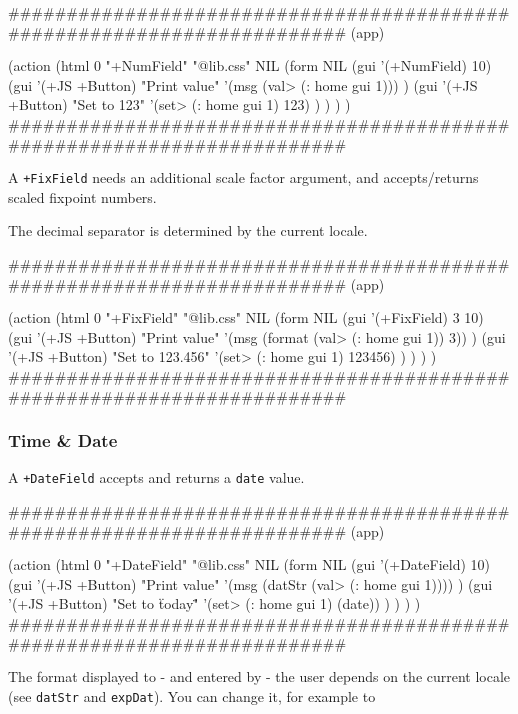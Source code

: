 \begin{wideverbatim}
########################################################################
(app)

(action
   (html 0 "+NumField" "@lib.css" NIL
      (form NIL
         (gui '(+NumField) 10)
         (gui '(+JS +Button) "Print value"
            '(msg (val> (: home gui 1))) )
         (gui '(+JS +Button) "Set to 123"
            '(set> (: home gui 1) 123) ) ) ) )
########################################################################
\end{wideverbatim}

A \texttt{+FixField} needs an additional scale factor argument, and
accepts/returns scaled fixpoint numbers.

The decimal separator is determined by the current locale.


\begin{wideverbatim}
########################################################################
(app)

(action
   (html 0 "+FixField" "@lib.css" NIL
      (form NIL
         (gui '(+FixField) 3 10)
         (gui '(+JS +Button) "Print value"
            '(msg (format (val> (: home gui 1)) 3)) )
         (gui '(+JS +Button) "Set to 123.456"
            '(set> (: home gui 1) 123456) ) ) ) )
########################################################################
\end{wideverbatim}

\subsubsection{ Time \& Date}
\label{sec:appl-devel-time-date}%

A \texttt{+DateField} accepts and returns a \texttt{date} value.

\begin{wideverbatim}
########################################################################
(app)

(action
   (html 0 "+DateField" "@lib.css" NIL
      (form NIL
         (gui '(+DateField) 10)
         (gui '(+JS +Button) "Print value"
            '(msg (datStr (val> (: home gui 1)))) )
         (gui '(+JS +Button) "Set to \"today\""
            '(set> (: home gui 1) (date)) ) ) ) )
########################################################################
\end{wideverbatim}

The format displayed to - and entered by - the user depends on the
current locale (see \texttt{datStr} and \texttt{expDat}). You can change it, for
example to


